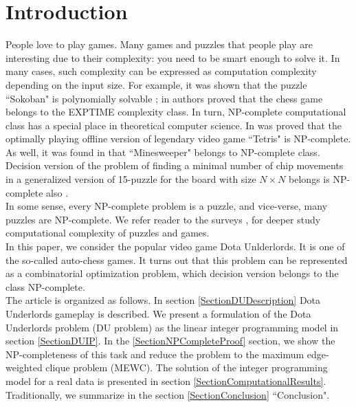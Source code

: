 \documentclass[smallextended]{svjour3}       %
\begin{document}
\section{Introduction}
People love to play games. Many games and puzzles that people play are interesting due to their complexity: you need to be smart enough to solve it. In many cases, such complexity can be expressed as computation complexity depending on the input size. For example, it was shown that the puzzle ``Sokoban" is polynomially solvable \cite{hearn2005pspace}; in \cite{fraenkel1981computing} authors proved that the chess game belongs to the EXPTIME complexity class. 
In turn, NP-complete computational class has a special place in theoretical computer science.
In \cite{breukelaar2004tetris} was proved that the optimally playing offline version of legendary video game ``Tetris" is NP-complete. As well, it was found in \cite{kaye2000minesweeper} that ``Minesweeper" belongs to NP-complete class. Decision version of the problem of finding a minimal number of chip movements in a generalized version of 15-puzzle for the board with size $N \times N$ belongs is NP-complete also \cite{ratner1986finding}.\\
In some sense, every NP-complete problem is a puzzle, and vice-verse, many puzzles are NP-complete. We refer reader to the surveys \cite{costa2018computational}, \cite{kendall2008survey} for deeper study computational complexity of puzzles and games.\\
In this paper, we consider the popular video game Dota Unlderlords. It is one of the so-called auto-chess games. It turns out that this problem can be represented as a combinatorial optimization problem, which decision version  belongs to the class NP-complete.\\
The article is organized as follows. In section \ref{SectionDUDescription} Dota Underlords gameplay is described.
We present a formulation of the Dota Underlords problem (DU problem) as the linear integer programming model in section \ref{SectionDUIP}. In the \ref{SectionNPCompleteProof} section, we show the NP-completeness of this task and reduce the problem to the maximum edge-weighted clique problem (MEWC). The solution of the integer programming model for a real data is presented in section \ref{SectionComputationalResults}. Traditionally, we summarize in the section \ref{SectionConclusion} ``Conclusion".
\end{document}
